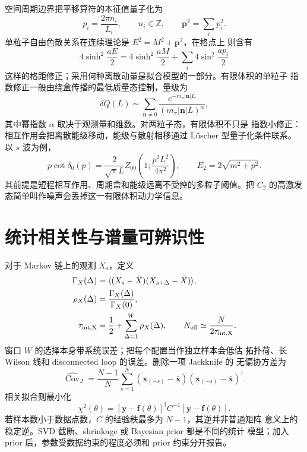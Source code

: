 \documentclass[UTF8,11pt,oneside]{ctexbook}
\begin{document}
空间周期边界把平移算符的本征值量子化为
\begin{equation}
 p_i=\frac{2\pi n_i}{L_i},\qquad n_i\in\mathbb Z,\qquad
 \boldsymbol p^2=\sum_i p_i^2 .
 \label{eq:deep-momentum-quantization}
\end{equation}
单粒子自由色散关系在连续理论是 \(E^2=M^2+\boldsymbol p^2\)，在格点上
则含有
\begin{equation}
 4\sinh^2\frac{aE}{2}
 =4\sinh^2\frac{aM}{2}
 +\sum_i4\sin^2\frac{ap_i}{2}
 \label{eq:deep-lattice-dispersion}
\end{equation}
这样的格距修正；采用何种离散动量是拟合模型的一部分。有限体积的单粒子
指数修正一般由绕盒传播的最低质量态控制，量级为
\begin{equation}
 \delta Q(L)\sim\sum_{\boldsymbol n\ne0}
 \frac{e^{-m_\pi|\boldsymbol n|L}}{(m_\pi|\boldsymbol n|L)^\alpha},
 \label{eq:deep-finite-volume}
\end{equation}
其中幂指数 \(\alpha\) 取决于观测量和维数。对两粒子态，有限体积不只是
指数小修正：相互作用会把离散能级移动，能级与散射相移通过 Lüscher
型量子化条件联系。以 \(s\) 波为例，
\begin{equation}
 p\cot\delta_0(p)=\frac{2}{\sqrt{\pi}L}
 Z_{00}\left(1;\frac{p^2L^2}{4\pi^2}\right),
 \qquad E_2=2\sqrt{m^2+p^2}.
 \label{eq:deep-luscher-condition}
\end{equation}
其前提是短程相互作用、周期盒和能级远离不受控的多粒子阈值。把
\(C_2\) 的高激发态简单叫作噪声会丢掉这一有限体积动力学信息。

\section{统计相关性与谱量可辨识性}

对于 Markov 链上的观测 \(X_s\)，定义
\begin{align}
 \Gamma_X(\Delta)&=\langle(X_s-\bar X)(X_{s+\Delta}-\bar X)\rangle,\\
 \rho_X(\Delta)&=\frac{\Gamma_X(\Delta)}{\Gamma_X(0)},\\
 \tau_{\rm int,X}&=\frac12+\sum_{\Delta=1}^{W}\rho_X(\Delta),
 \qquad N_{\rm eff}\simeq\frac{N}{2\tau_{\rm int,X}} .
 \label{eq:deep-autocorrelation}
\end{align}
窗口 \(W\) 的选择本身带系统误差；把每个配置当作独立样本会低估
拓扑荷、长 Wilson 线和 disconnected loop 的误差。删除一项 Jackknife 的
无偏协方差为
\begin{equation}
 \widehat{\operatorname{Cov}}_J
 =\frac{N-1}{N}\sum_{s=1}^{N}
 (\boldsymbol x_{(-s)}-\bar{\boldsymbol x})
 (\boldsymbol x_{(-s)}-\bar{\boldsymbol x})^\dagger .
 \label{eq:deep-jackknife-covariance}
\end{equation}
相关拟合则最小化
\begin{equation}
 \chi^2(\theta)=
 [\boldsymbol y-\boldsymbol f(\theta)]^\dagger
 C^{-1}[\boldsymbol y-\boldsymbol f(\theta)] .
 \label{eq:deep-correlated-fit}
\end{equation}
若样本数小于数据点数，\(C\) 的经验秩最多为 \(N-1\)，其逆并非普通矩阵
意义上的稳定逆。SVD 截断、shrinkage 或 Bayesian prior 都是不同的统计
模型；加入 prior 后，参数受数据约束的程度必须和 prior 约束分开报告。
\end{document}
